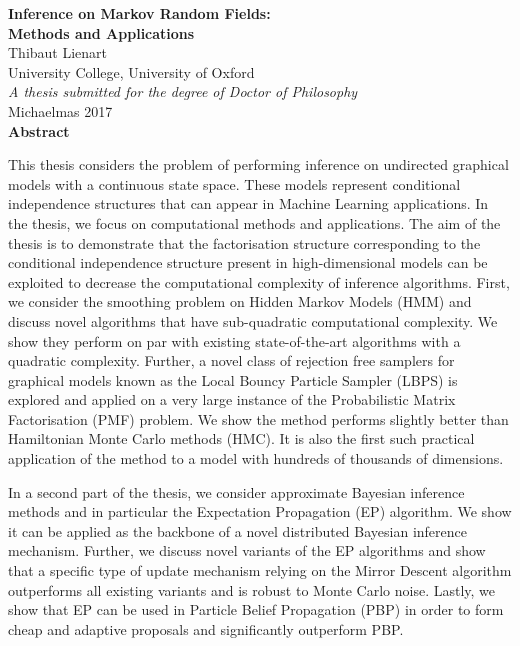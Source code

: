 
\begin{center}
{\Large\bfseries Inference on Markov Random Fields:\\[.2cm]
Methods and Applications}\\[1cm]
{\large Thibaut Lienart}\\[.3cm]
University College, University of Oxford\\[1cm]
\emph{A thesis submitted for the degree of Doctor of Philosophy}\\[.3cm]
Michaelmas 2017\\[1.5cm]

{\large\bfseries Abstract}
\begin{flushleft}
This thesis considers the problem of performing inference on undirected graphical models with a continuous state space. These models represent conditional independence structures that can appear in Machine Learning applications. In the thesis, we focus on computational methods and applications. The aim of the thesis is to demonstrate that the factorisation structure corresponding to the conditional independence structure present in high-dimensional models can be exploited to decrease the computational complexity of inference algorithms.
First, we consider the smoothing problem on Hidden Markov Models (HMM) and discuss novel algorithms that have sub-quadratic computational complexity. We show they perform on par with existing state-of-the-art algorithms with a quadratic complexity. Further, a novel class of rejection free samplers for graphical models known as the Local Bouncy Particle Sampler (LBPS) is explored and applied on a very large instance of the Probabilistic Matrix Factorisation (PMF) problem. We show the method performs slightly better than Hamiltonian Monte Carlo methods (HMC). It is also the first such practical application of the method to a model with hundreds of thousands of dimensions. 

In a second part of the thesis, we consider approximate Bayesian inference methods and in particular the Expectation Propagation (EP) algorithm. We show it can be applied as the backbone of a novel distributed Bayesian inference mechanism. Further, we discuss novel variants of the EP algorithms and show that a specific type of update mechanism relying on the Mirror Descent algorithm outperforms all existing variants and is robust to Monte Carlo noise. Lastly, we show that EP can be used in Particle Belief Propagation (PBP) in order to form cheap and adaptive proposals and significantly outperform PBP. 
\end{flushleft}
\end{center}
